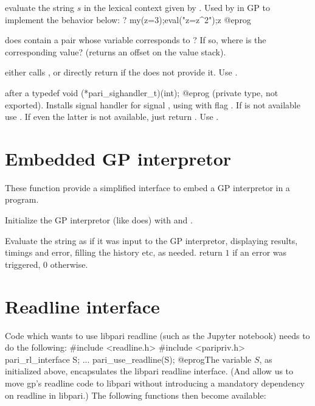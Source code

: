  evaluate the string $s$
in the lexical context given by .  Used by  in GP
to implement the behavior below:
\bprog
? my(z=3);eval("z=z^2");z
@eprog

 does  contain
a pair whose variable corresponds to ? If so, where is the
corresponding value? (returns an offset on the value stack).


 either calls , or directly
return  if the  does not provide it. Use .

 after a
\bprog
  typedef void (*pari_sighandler_t)(int);
@eprog\noindent
(private type, not exported). Installs signal handler  for
signal , using  with flag . If
 is not available use . If even the latter is not
available, just return . Use .

\section{Embedded GP interpretor}
These function provide a simplified interface to embed a GP
interpretor in a program.

Initialize the GP interpretor (like  does) with
 and .

Evaluate the string  as if it was input to the GP interpretor,
displaying results, timings and error, filling the history etc, as
needed. return $1$ if an error was triggered, $0$ otherwise.

\section{Readline interface}

Code which wants to use libpari readline (such as the Jupyter notebook)
needs to do the following:
\bprog
#include <readline.h>
#include <paripriv.h>
pari_rl_interface S;
...
pari_use_readline(S);
@eprog\noindent The variable $S$, as initialized above, encapsulates
the libpari readline interface. (And allow us to move gp's readline code
to libpari without introducing a mandatory dependency on readline in
libpari.) The following functions then become available:

